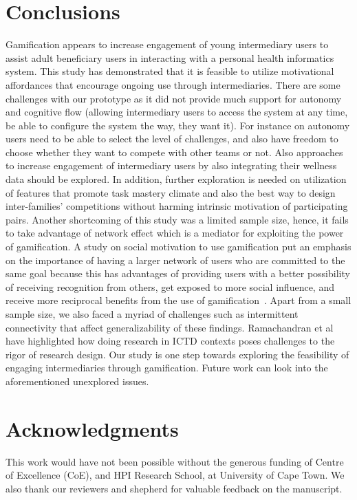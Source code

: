 \documentclass{sig-alternate}
\begin{document}
\section{Conclusions}
Gamification appears to increase engagement of young intermediary users to assist adult beneficiary users in interacting with a personal health informatics system. This study has demonstrated that it is feasible to utilize motivational affordances that encourage ongoing use through intermediaries. There are some challenges with our prototype as it did not provide much support for autonomy and cognitive flow (allowing intermediary users to access the system at any time, be able to configure the system the way, they want it). For instance on autonomy users need to be able to select the level of challenges, and also have freedom to choose whether they want to compete with other teams or not. Also approaches to increase engagement of intermediary users by also integrating their wellness data should be explored. In addition, further exploration is needed on utilization of features that promote task mastery climate and also the best way to design inter-families' competitions without harming intrinsic motivation of participating pairs. Another shortcoming of this study was a limited sample size, hence, it fails to take advantage of network effect which is a mediator for exploiting the power of gamification. A study on social motivation to use gamification put an emphasis on the importance of having a larger network of users who are committed to the same goal because this has advantages of providing users with a better possibility of receiving recognition from others, get exposed to more social influence, and receive more reciprocal benefits from the use of gamification~\cite{hamari2013social}. Apart from a small sample size, we also faced a myriad of challenges such as intermittent connectivity that affect generalizability of these findings. Ramachandran et al ~\cite{ramachandran2010research} have highlighted how doing research in ICTD contexts poses challenges to the rigor of research design. Our study is one step towards exploring the feasibility of engaging intermediaries through gamification. Future work can look into the aforementioned unexplored issues. 

\section{Acknowledgments} 
This work would have not been possible without the generous funding of Centre of Excellence (CoE), and HPI Research School, at University of Cape Town.  We also thank our reviewers and shepherd for valuable feedback on the manuscript.
\end{document}
